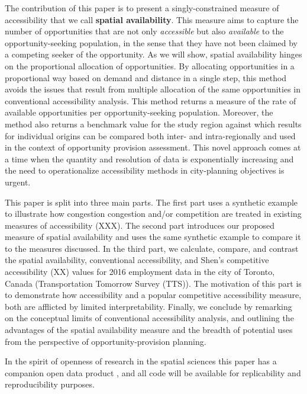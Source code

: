 \documentclass[]{elsarticle} %
\begin{document}
The contribution of this paper is to present a singly-constrained
measure of accessibility that we call \textbf{spatial availability}.
This measure aims to capture the number of opportunities that are not
only \emph{accessible} but also \emph{available} to the
opportunity-seeking population, in the sense that they have not been
claimed by a competing seeker of the opportunity. As we will show,
spatial availability hinges on the proportional allocation of
opportunities. By allocating opportunities in a proportional way based
on demand and distance in a single step, this method avoids the issues
that result from multiple allocation of the same opportunities in
conventional accessibility analysis. This method returns a measure of
the rate of available opportunities per opportunity-seeking population.
Moreover, the method also returns a benchmark value for the study region
against which results for individual origins can be compared both inter-
and intra-regionally and used in the context of opportunity provision
assessment. This novel approach comes at a time when the quantity and
resolution of data is exponentially increasing and the need to
operationalize accessibility methods in city-planning objectives is
urgent.

This paper is split into three main parts. The first part uses a
synthetic example to illustrate how congestion congestion and/or
competition are treated in existing measures of accessibility (XXX). The
second part introduces our proposed measure of spatial availability and
uses the same synthetic example to compare it to the measures discussed.
In the third part, we calculate, compare, and contrast the spatial
availability, conventional accessibility, and Shen's competitive
accessibility (XX) values for 2016 employment data in the city of
Toronto, Canada (Transportation Tomorrow Survey (TTS)). The motivation
of this part is to demonstrate how accessibility and a popular
competitive accessibility measure, both are afflicted by limited
interpretability. Finally, we conclude by remarking on the conceptual
limits of conventional accessibility analysis, and outlining the
advantages of the spatial availability measure and the breadth of
potential uses from the perspective of opportunity-provision planning.

In the spirit of openness of research in the spatial sciences
\citep{brunsdon2021opening, paez2021open} this paper has a companion
open data product \citep{arribas2021Open}, and all code will be
available for replicability and reproducibility purposes.
\end{document}
